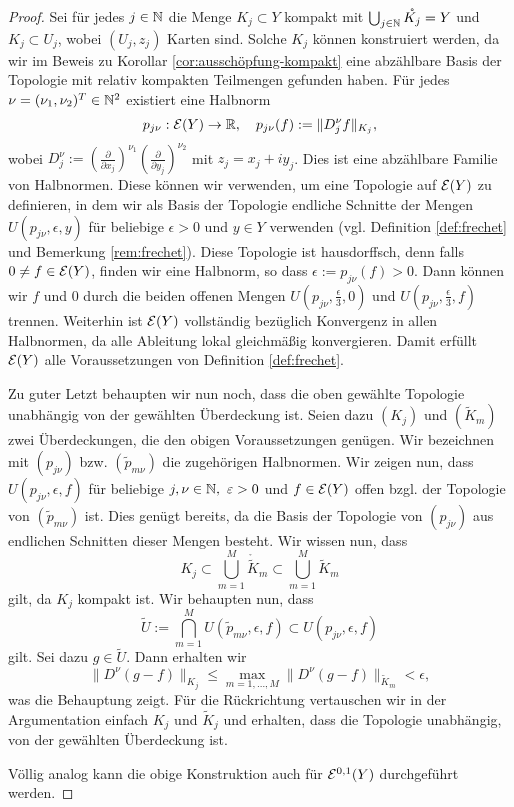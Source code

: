 \begin{proof}
  Sei für jedes $j \in \mathbb{N}$ die Menge $K_j \subset Y$ kompakt mit $\bigcup_{j \in \mathbb{N}}
  \mathring{K_j} = Y$ und $K_j \subset U_j$, wobei $(U_j, z_j)$ Karten
  sind. Solche $K_j$ können konstruiert werden, da wir im Beweis zu
  Korollar \ref{cor:ausschöpfung-kompakt} eine abzählbare Basis der
  Topologie mit relativ kompakten Teilmengen gefunden haben.
  Für jedes $\nu = (\nu_1, \nu_2)^T \in \mathbb{N}^2$ existiert eine Halbnorm
  \[
  p_{j\nu}: \mathcal{E}(Y) \rightarrow \mathbb{R}, \quad p_{j\nu}(f) := \|D_j^\nu f\|_{K_j},
  \]
  wobei $D^\nu_j := \left ( \frac{\partial}{\partial x_j} \right
  )^{\nu_1} \left ( \frac{\partial}{\partial y_j} \right )^{\nu_2}$
  mit $z_j = x_j + iy_j$. Dies ist eine abzählbare Familie von
  Halbnormen. Diese können wir verwenden, um eine Topologie auf
  $\mathcal{E}(Y)$ zu definieren, in dem wir als Basis der Topologie
  endliche Schnitte der Mengen $U(p_{j\nu}, \epsilon, y)$ für
  beliebige $\epsilon > 0$ und $y \in Y$ verwenden (vgl. Definition
  \ref{def:frechet} und Bemerkung \ref{rem:frechet}). Diese Topologie
  ist hausdorffsch, denn falls $0 \neq f \in \mathcal{E}(Y)$, finden wir
  eine Halbnorm, so dass $\epsilon := p_{j\nu}(f) > 0$. Dann können wir $f$ und 0
  durch die beiden offenen Mengen $U(p_{j\nu}, \frac{\epsilon}{3}, 0)$
  und $U(p_{j\nu}, \frac{\epsilon}{3}, f)$ trennen. Weiterhin ist
  $\mathcal{E}(Y)$ vollständig bezüglich Konvergenz in allen Halbnormen, da
  alle Ableitung lokal gleichmäßig konvergieren. Damit erfüllt
  $\mathcal{E}(Y)$ alle Voraussetzungen von Definition \ref{def:frechet}.
  
  Zu guter Letzt behaupten wir nun noch, dass die oben gewählte
  Topologie unabhängig von der gewählten Überdeckung ist. Seien dazu
  $(K_j)$ und $(\tilde K_m)$ zwei Überdeckungen, die den obigen
  Voraussetzungen genügen. Wir bezeichnen mit $(p_{j\nu})$
  bzw. $(\tilde p_{m\nu})$ die zugehörigen Halbnormen. Wir zeigen nun,
  dass $U(p_{j\nu}, \epsilon, f)$ für beliebige $j, \nu \in\mathbb{N},\
  \varepsilon > 0$ und $f \in \mathcal{E}(Y)$ offen bzgl. der Topologie von
  $(\tilde p_{m\nu})$ ist. Dies genügt bereits, da die Basis der
  Topologie von $(p_{j\nu})$ aus endlichen Schnitten dieser Mengen
  besteht. Wir wissen nun, dass
  \[
  K_j \subset \bigcup_{m=1}^M \mathring{\tilde K}_m \subset \bigcup_{m=1}^M \tilde K_m
  \]
  gilt, da
  $K_j$ kompakt ist. Wir behaupten nun, dass
  \[
  \tilde U := \bigcap_{m=1}^M U(\tilde p_{m\nu}, \epsilon, f) \subset
  U(p_{j\nu}, \epsilon, f)
  \]
  gilt. Sei dazu $g \in \tilde U$. Dann erhalten wir
  \[
  \|D^\nu(g-f)\|_{K_j} \leq \max_{m=1, \dots, M} \|D^\nu(g-f)\|_{\tilde
    K_m} < \epsilon,
  \]
  was die Behauptung zeigt. Für die Rückrichtung vertauschen wir in
  der Argumentation einfach $K_j$ und $\tilde K_j$ und erhalten, dass
  die Topologie unabhängig, von der gewählten Überdeckung ist.
  
  Völlig analog kann die obige Konstruktion auch für $\mathcal{E}^{0,1}(Y)$
  durchgeführt werden.
\end{proof}

